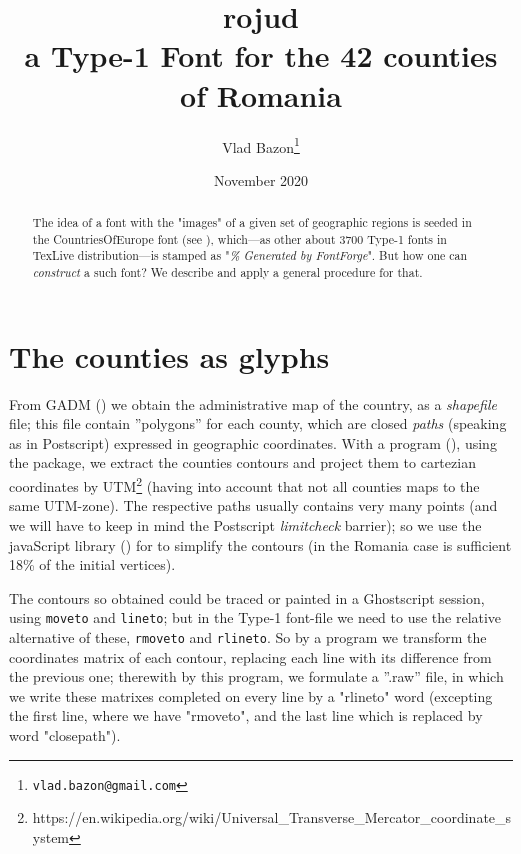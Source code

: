 \documentclass[a4paper,11pt]{article}
\title{rojud \\[.25cm]
    \normalsize{a Type-1 Font for the 42 counties of Romania}
}
\author{Vlad Bazon\footnote{\texttt{vlad.bazon@gmail.com}}
}
\date{\normalsize{November 2020}}
\begin{document}
\maketitle

\begin{abstract}
The idea of a font with the "images" of a given set of geographic regions is seeded in the \textsf{CountriesOfEurope} font (see \cite{CoE}), which---as other about 3700 Type-1 fonts in TexLive distribution---is stamped as "\emph{\% Generated by FontForge}". But how one can \emph{construct} a such font? We describe and apply a general procedure for that.
\end{abstract}

\section{The counties as glyphs}

From \textsf{GADM} (\cite{GADM}) we obtain the administrative map of the country, as a \emph{shapefile} file; this file contain ''polygons'' for each county, which are closed \emph{paths} {\small(speaking as in Postscript)} expressed in geographic coordinates. With a  program (\cite{R}), using the  package, we extract the counties contours and project them to cartezian coordinates by \textsf{UTM}\footnote{https://en.wikipedia.org/wiki/Universal\_Transverse\_Mercator\_coordinate\_system} {\small(having into account that not all counties maps to the same \textsf{UTM}-zone)}. The respective paths usually contains very many points {\small(and we will have to keep in mind the Postscript \textsf{\emph{limitcheck}} barrier)}; so we use the javaScript  library (\cite{mapshaper}) for to simplify the contours {\small(in the Romania case is sufficient 18\% of the initial vertices)}.

The contours so obtained could be traced or painted in a Ghostscript session, using \texttt{moveto} and \texttt{lineto}; but in the Type-1 font-file we need to use the relative alternative of these, \texttt{rmoveto} and \texttt{rlineto}. So by a  program we transform the coordinates matrix of each contour, replacing each line with its difference from the previous one; therewith by this  program, we formulate a ''\textsf{.raw}'' file, in which we write these matrixes completed on every line by a "rlineto" word {\small(excepting the first line, where we have "rmoveto", and the last line which is replaced by word "closepath")}. 
\end{document}
